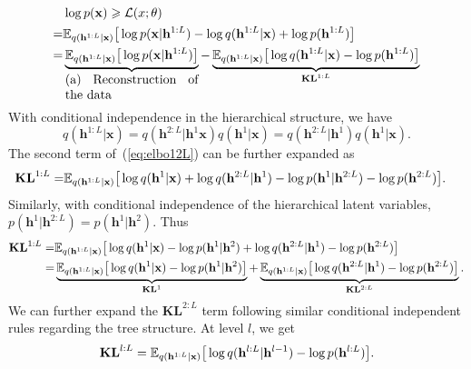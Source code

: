\documentclass{article}
\begin{document}
\begin{align} \notag  %
&\log p(\mathbf{x})  \geqslant  \mathcal{L}(x; \theta) \\ \notag
=& \mathbb{E}_{q(\mathbf{h}^{1:L}|\mathbf{x})}\big[ \log p(\mathbf{x}|\mathbf{h}^{1:L}) -  \log q(\mathbf{h}^{1:L}|\mathbf{x}) +  \log p(\mathbf{h}^{1:L}) \big] \\ \label{eq:elbo12L}
=&  \underbrace{\mathbb{E}_{q(\mathbf{h}^{1:L}|\mathbf{x})}\big[ \log p(\mathbf{x}|\mathbf{h}^{1:L})\big]}_{\parbox{10.5em}{(a) Reconstruction of the data}}  -  \underbrace{\mathbb{E}_{q(\mathbf{h}^{1:L}|\mathbf{x})}\big[ \log q(\mathbf{h}^{1:L}|\mathbf{x}) - \log p(\mathbf{h}^{1:L}) \big] }_{\textbf{\text{KL}}^{1:L}}
\end{align}
With conditional independence in   the hierarchical structure, we have 
$$q(\mathbf{h}^{1:L}|\mathbf{x})=q(\mathbf{h}^{2:L}|\mathbf{h}^1\mathbf{x})q(\mathbf{h}^{1}|\mathbf{x})=q(\mathbf{h}^{2:L}|\mathbf{h}^1)q(\mathbf{h}^{1}|\mathbf{x}).$$
The second term of~(\ref{eq:elbo12L}) can be further expanded as 
 \begin{align} \notag 
\textbf{\text{KL}}^{1:L} =&  \mathbb{E}_{q(\mathbf{h}^{1:L}|\mathbf{x})}\big[  \log q(\mathbf{h}^{1}|\mathbf{x})  +  \log q(\mathbf{h}^{2:L}|\mathbf{h}^{1})  - \log p(\mathbf{h}^{1}|\mathbf{h}^{2:L}) - \log p(\mathbf{h}^{2:L})  \big].
\end{align}
Similarly, with conditional independence of the hierarchical latent variables, $ p(\mathbf{h}^{1}|\mathbf{h}^{2:L})= p(\mathbf{h}^{1}|\mathbf{h}^{2})$. Thus
 \begin{align} \notag 
\textbf{\text{KL}}^{1:L} =&  \mathbb{E}_{q(\mathbf{h}^{1:L}|\mathbf{x})}\big[  \log q(\mathbf{h}^{1}|\mathbf{x})   - \log p(\mathbf{h}^{1}|\mathbf{h}^{2})  +  \log q(\mathbf{h}^{2:L}|\mathbf{h}^{1})- \log p(\mathbf{h}^{2:L})  \big]\\ \notag
=&  \underbrace{\mathbb{E}_{q(\mathbf{h}^{1:L}|\mathbf{x})}\big[  \log q(\mathbf{h}^{1}|\mathbf{x})   - \log p(\mathbf{h}^{1}|\mathbf{h}^{2}) \big]}_{\mathbf{KL}^1} + \underbrace{\mathbb{E}_{q(\mathbf{h}^{1:L}|\mathbf{x})}\big[  \log q(\mathbf{h}^{2:L}|\mathbf{h}^{1})- \log p(\mathbf{h}^{2:L})  \big]}_{\mathbf{KL}^{2:L}}.
\end{align}
We can further expand the $\mathbf{KL}^{2:L}$ term following similar conditional independent rules regarding the tree structure.
At level $l$, we get
$$\textbf{\text{KL}}^{l:L} 
= \mathbb{E}_{q(\mathbf{h}^{1:L}|\mathbf{x})}\big[  \log q(\mathbf{h}^{l:L}|\mathbf{h}^{l-1})- \log p(\mathbf{h}^{l:L})  \big].$$
\end{document}
